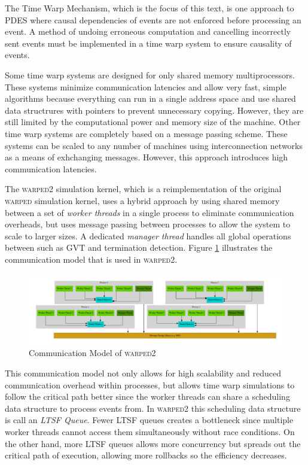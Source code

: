 \documentclass[11pt]{book}
\begin{document}
The Time Warp Mechanism\cite{jefferson-85}, which is the focus of this text, is one approach
to PDES where causal dependencies of events are not enforced before processing an event. A method
of undoing erroneous computation and cancelling incorrectly sent events must be implemented in
a time warp system to ensure causality of events.

Some time warp systems are designed for only shared memory multiprocessors. These systems
minimize communication latencies and allow very fast, simple algorithms because everything
can run in a single address space and use shared data structrures with pointers to prevent
unnecessary copying. However, they are still limited by the computational power and memory
size of the machine. Other time warp systems are completely based on a message passing scheme.
These systems can be scaled to any number of machines using interconnection networks as a means
of exhchanging messages. However, this approach introduces high communication latencies.

The \textsc{warped2} simulation kernel, which is a reimplementation of the original
\textsc{warped} simulation kernel, uses a hybrid approach by using shared memory between a set
of \emph{worker threads} in a single process to eliminate communication overheads, but uses
message passing between processes to allow the system to scale to larger sizes. A dedicated
\emph{manager thread} handles all global operations between such as GVT and termination detection.
Figure \ref{warped2_communication} illustrates the communication model that is used in \textsc{warped2}.

\begin{figure}[H]
    \centering
    \includegraphics[width=\textwidth,quiet]{figs/graphviz/warped_communication.pdf}
    \caption{Communication Model of \textsc{warped2}}\label{warped2_communication}
\end{figure}

\noindent
This communication model not only allows for high scalability and reduced communication
overhead within processes, but allows time warp simulations to follow the critical path better
since the worker threads can share a scheduling data structure to process events from. In
\textsc{warped2} this scheduling data structure is call an \emph{LTSF Queue}. Fewer LTSF queues
creates a bottleneck since multiple worker threads cannot access them simultaneously without
race conditions. On the other hand, more LTSF queues allows more concurrency but spreads out the
critical path of execution, allowing more rollbacks so the efficiency decreases.
\end{document}
